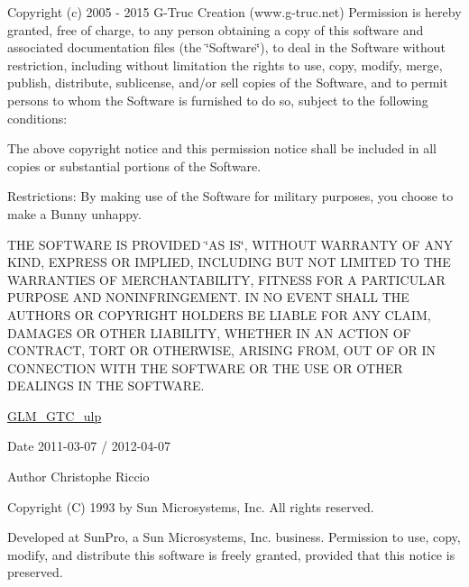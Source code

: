 Copyright (c) 2005 -\/ 2015 G-\/\+Truc Creation (www.\+g-\/truc.\+net) Permission is hereby granted, free of charge, to any person obtaining a copy of this software and associated documentation files (the \char`\"{}\+Software\char`\"{}), to deal in the Software without restriction, including without limitation the rights to use, copy, modify, merge, publish, distribute, sublicense, and/or sell copies of the Software, and to permit persons to whom the Software is furnished to do so, subject to the following conditions\+:

The above copyright notice and this permission notice shall be included in all copies or substantial portions of the Software.

Restrictions\+: By making use of the Software for military purposes, you choose to make a Bunny unhappy.

T\+H\+E S\+O\+F\+T\+W\+A\+R\+E I\+S P\+R\+O\+V\+I\+D\+E\+D \char`\"{}\+A\+S I\+S\char`\"{}, W\+I\+T\+H\+O\+U\+T W\+A\+R\+R\+A\+N\+T\+Y O\+F A\+N\+Y K\+I\+N\+D, E\+X\+P\+R\+E\+S\+S O\+R I\+M\+P\+L\+I\+E\+D, I\+N\+C\+L\+U\+D\+I\+N\+G B\+U\+T N\+O\+T L\+I\+M\+I\+T\+E\+D T\+O T\+H\+E W\+A\+R\+R\+A\+N\+T\+I\+E\+S O\+F M\+E\+R\+C\+H\+A\+N\+T\+A\+B\+I\+L\+I\+T\+Y, F\+I\+T\+N\+E\+S\+S F\+O\+R A P\+A\+R\+T\+I\+C\+U\+L\+A\+R P\+U\+R\+P\+O\+S\+E A\+N\+D N\+O\+N\+I\+N\+F\+R\+I\+N\+G\+E\+M\+E\+N\+T. I\+N N\+O E\+V\+E\+N\+T S\+H\+A\+L\+L T\+H\+E A\+U\+T\+H\+O\+R\+S O\+R C\+O\+P\+Y\+R\+I\+G\+H\+T H\+O\+L\+D\+E\+R\+S B\+E L\+I\+A\+B\+L\+E F\+O\+R A\+N\+Y C\+L\+A\+I\+M, D\+A\+M\+A\+G\+E\+S O\+R O\+T\+H\+E\+R L\+I\+A\+B\+I\+L\+I\+T\+Y, W\+H\+E\+T\+H\+E\+R I\+N A\+N A\+C\+T\+I\+O\+N O\+F C\+O\+N\+T\+R\+A\+C\+T, T\+O\+R\+T O\+R O\+T\+H\+E\+R\+W\+I\+S\+E, A\+R\+I\+S\+I\+N\+G F\+R\+O\+M, O\+U\+T O\+F O\+R I\+N C\+O\+N\+N\+E\+C\+T\+I\+O\+N W\+I\+T\+H T\+H\+E S\+O\+F\+T\+W\+A\+R\+E O\+R T\+H\+E U\+S\+E O\+R O\+T\+H\+E\+R D\+E\+A\+L\+I\+N\+G\+S I\+N T\+H\+E S\+O\+F\+T\+W\+A\+R\+E.

\hyperlink{group__gtc__ulp}{G\+L\+M\+\_\+\+G\+T\+C\+\_\+ulp}

\begin{DoxyDate}{Date}
2011-\/03-\/07 / 2012-\/04-\/07 
\end{DoxyDate}
\begin{DoxyAuthor}{Author}
Christophe Riccio
\end{DoxyAuthor}
Copyright (C) 1993 by Sun Microsystems, Inc. All rights reserved.

Developed at Sun\+Pro, a Sun Microsystems, Inc. business. Permission to use, copy, modify, and distribute this software is freely granted, provided that this notice is preserved. 

